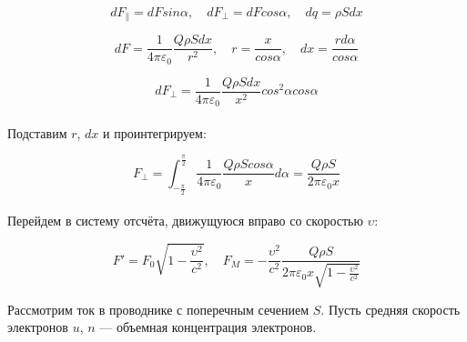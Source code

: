 \documentclass[dvipdfmx]{article}
\begin{document}
\paragraph{}

\begin{equation*}
  dF_\parallel = dFsin\alpha, \quad dF_\perp = dFcos\alpha, \quad dq = \rho Sdx
\end{equation*}

\begin{equation*}
  dF = \frac{1}{4\pi\varepsilon_0}\frac{Q\rho Sdx}{r^2}, \quad r = \frac{x}{cos\alpha},
  \quad dx = \frac{rd\alpha}{cos\alpha}
\end{equation*}

\begin{equation*}
  dF_\perp = \frac{1}{4\pi\varepsilon_0}\frac{Q\rho Sdx}{x^2}cos^2\alpha cos\alpha
\end{equation*}
\paragraph{}

Подставим $r$, $dx$ и проинтегрируем:

\begin{equation*}
  F_\perp = \int_{-\frac{\pi}{2}}^{\frac{\pi}{2}}\frac{1}{4\pi\varepsilon_0}\frac{Q\rho Scos\alpha}{x}d\alpha =
  \frac{Q\rho S}{2\pi\varepsilon_0x}
\end{equation*}
\paragraph{}

Перейдем в систему отсчёта, движущуюся вправо со скоростью $\upsilon$:

\begin{equation*}
  F' = F_0\sqrt{1-\frac{\upsilon^2}{c^2}}, \quad F_M = -\frac{\upsilon^2}{c^2}\frac{Q\rho S}
  {2\pi\varepsilon_0x\sqrt{1-\frac{\upsilon^2}{c^2}}}
\end{equation*}

\newpage

Рассмотрим ток в проводнике с поперечным сечением $S$. Пусть средняя скорость электронов $u$,
$n$ --- объемная концентрация электронов.

\paragraph{}
\noindent{}
\end{document}
